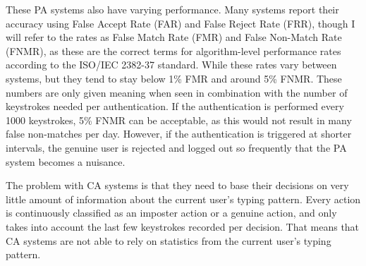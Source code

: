 \documentclass[informationsecurity]{gucmasterproject}
\begin{document}
These PA systems also have varying performance.
Many systems report their accuracy using False Accept Rate (FAR) and False Reject Rate (FRR), though I will refer to the rates as False Match Rate (FMR) and False Non-Match Rate (FNMR), as these are the correct terms for algorithm-level performance rates according to the ISO/IEC 2382-37 standard.
While these rates vary between systems, but they tend to stay below 1\% FMR and around 5\% FNMR.
These numbers are only given meaning when seen in combination with the number of keystrokes needed per authentication.
If the authentication is performed every 1000 keystrokes, 5\% FNMR can be acceptable, as this would not result in many false non-matches per day.
However, if the authentication is triggered at shorter intervals, the genuine user is rejected and logged out so frequently that the PA system becomes a nuisance.

The problem with CA systems is that they need to base their decisions on very little amount of information about the current user's typing pattern.
Every action is continuously classified as an imposter action or a genuine action, and only takes into account the last few keystrokes recorded per decision.
That means that CA systems are not able to rely on statistics from the current user's typing pattern.


%
\end{document}
